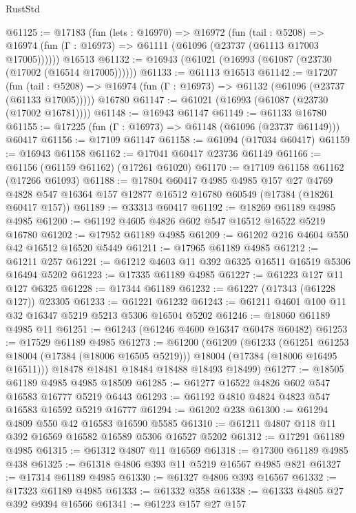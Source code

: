\begin{lexlean}{RustStd}
\begin{coremodule}
@61125 := @17183
    (fun (lets : @16970) =>
    @16972
      (fun (tail : @5208) =>
      @16974 (fun (Γ : @16973) => @61111 (@61096 (@23737 (@61113 @17003 @17005))))))
    @16513
@61132 := @16943 (@61021 (@16993 (@61087 (@23730 (@17002 (@16514 @17005))))))
@61133 := @61113 @16513
@61142 := @17207
    (fun (tail : @5208) => @16974 (fun (Γ : @16973) => @61132 (@61096 (@23737 (@61133 @17005)))))
    @16780
@61147 := @61021 (@16993 (@61087 (@23730 (@17002 @16781))))
@61148 := @16943 @61147
@61149 := @61133 @16780
@61155 := @17225 (fun (Γ : @16973) => @61148 (@61096 (@23737 @61149))) @60417
@61156 := @17109 @61147
@61158 := @61094 (@17034 @60417)
@61159 := @16943 @61158
@61162 := @17041 @60417 @23736 @61149
@61166 := @61156 (@61159 @61162) (@17261 @61020)
@61170 := @17109 @61158 @61162 (@17266 @61093)
@61188 := @17804
    @60417
    @4985
    @4985
    @157
    @27
    @4769
    @4828
    @547
    @16364
    @157
    @12877
    @16512
    @16780
    @60549
    (@17384 (@18261 @60417 @157))
@61189 := @33313 @60417
@61192 := @18269 @61189 @4985 @4985
@61200 := @61192 @4605 @4826 @602 @547 @16512 @16522 @5219 @16780
@61202 := @17952 @61189 @4985
@61209 := @61202 @216 @4604 @550 @42 @16512 @16520 @5449
@61211 := @17965 @61189 @4985
@61212 := @61211 @257
@61221 := @61212 @4603 @11 @392 @6325 @16511 @16519 @5306 @16494 @5202
@61223 := @17335 @61189 @4985
@61227 := @61223 @127 @11 @127 @6325
@61228 := @17344 @61189
@61232 := @61227 (@17343 (@61228 @127)) @23305
@61233 := @61221 @61232
@61243 := @61211 @4601 @100 @11 @32 @16347 @5219 @5213 @5306 @16504 @5202
@61246 := @18060 @61189 @4985 @11
@61251 := @61243 (@61246 @4600 @16347 @60478 @60482)
@61253 := @17529 @61189 @4985
@61273 := @61200
    (@61209
      (@61233
        (@61251 @61253 @18004 (@17384 (@18006 @16505 @5219)))
        @18004
        (@17384 (@18006 @16495 @16511)))
      @18478
      @18481
      @18484
      @18488
      @18493
      @18499)
@61277 := @18505 @61189 @4985 @4985 @18509
@61285 := @61277 @16522 @4826 @602 @547 @16583 @16777 @5219 @6443
@61293 := @61192 @4810 @4824 @4823 @547 @16583 @16592 @5219 @16777
@61294 := @61202 @238
@61300 := @61294 @4809 @550 @42 @16583 @16590 @5585
@61310 := @61211 @4807 @118 @11 @392 @16569 @16582 @16589 @5306 @16527 @5202
@61312 := @17291 @61189 @4985
@61315 := @61312 @4807 @11 @16569
@61318 := @17300 @61189 @4985 @438
@61325 := @61318 @4806 @393 @11 @5219 @16567 @4985 @821
@61327 := @17314 @61189 @4985
@61330 := @61327 @4806 @393 @16567
@61332 := @17323 @61189 @4985
@61333 := @61332 @358
@61338 := @61333 @4805 @27 @392 @9394 @16566
@61341 := @61223 @157 @27 @157

\end{coremodule}
\end{lexlean}
